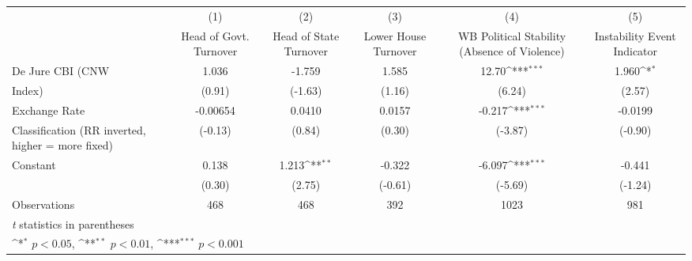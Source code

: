 {
\def\sym#1{\ifmmode^{#1}\else\(^{#1}\)\fi}
\begin{tabular}{l*{5}{c}}
\hline\hline
                    &\multicolumn{1}{c}{(1)}&\multicolumn{1}{c}{(2)}&\multicolumn{1}{c}{(3)}&\multicolumn{1}{c}{(4)}&\multicolumn{1}{c}{(5)}\\
                    &\multicolumn{1}{c}{Head of Govt. Turnover}&\multicolumn{1}{c}{Head of State Turnover}&\multicolumn{1}{c}{Lower House Turnover}&\multicolumn{1}{c}{WB Political Stability (Absence of Violence)}&\multicolumn{1}{c}{Instability Event Indicator}\\
\hline
De Jure CBI (CNW    &       1.036         &      -1.759         &       1.585         &       12.70\sym{***}&       1.960\sym{*}  \\
Index)              &      (0.91)         &     (-1.63)         &      (1.16)         &      (6.24)         &      (2.57)         \\
[1em]
Exchange Rate       &    -0.00654         &      0.0410         &      0.0157         &      -0.217\sym{***}&     -0.0199         \\
Classification (RR inverted, higher = more fixed)&     (-0.13)         &      (0.84)         &      (0.30)         &     (-3.87)         &     (-0.90)         \\
[1em]
Constant            &       0.138         &       1.213\sym{**} &      -0.322         &      -6.097\sym{***}&      -0.441         \\
                    &      (0.30)         &      (2.75)         &     (-0.61)         &     (-5.69)         &     (-1.24)         \\
\hline
Observations        &         468         &         468         &         392         &        1023         &         981         \\
\hline\hline
\multicolumn{6}{l}{\footnotesize \textit{t} statistics in parentheses}\\
\multicolumn{6}{l}{\footnotesize \sym{*} \(p<0.05\), \sym{**} \(p<0.01\), \sym{***} \(p<0.001\)}\\
\end{tabular}
}
